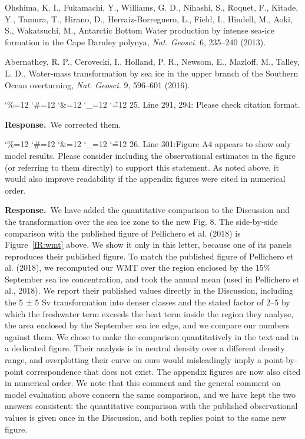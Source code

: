 \documentclass[11pt,a4paper]{article}
\newcommand{\comment}[1]{\par\medskip\noindent\color{black}\begingroup\catcode`\%=12 \catcode`\#=12 \catcode`\&=12 \catcode`\_=12 \catcode`\~=12 \commentbody}
\newcommand{\commentbody}[1]{#1\endgroup\par\smallskip}
\newcommand{\response}{\par\noindent\color{chgcol}\textbf{Response.}\ }
\begin{document}
Ohshima, K. I., Fukamachi, Y., Williams, G. D., Nihashi, S., Roquet, F., Kitade, Y., Tamura, T., Hirano, D., Herraiz-Borreguero, L., Field, I., Hindell, M., Aoki, S., Wakatsuchi, M., Antarctic Bottom Water production by intense sea-ice formation in the Cape Darnley polynya, \textit{Nat. Geosci.} 6, 235–240 (2013).

Abernathey, R. P., Cerovecki, I., Holland, P. R., Newsom, E., Mazloff, M., Talley, L. D., Water-mass transformation by sea ice in the upper branch of the Southern Ocean overturning, \textit{Nat. Geosci.} 9, 596–601 (2016).

\comment{R1}{25. Line 291, 294: Please check citation format.}

\response We corrected them.

\comment{R1}{26. Line 301:Figure A4 appears to show only model results. Please consider including the observational estimates in the figure (or referring to them directly) to support this statement. As noted above, it would also improve readability if the appendix figures were cited in numerical order.}

\response We have added the quantitative comparison to the Discussion and the transformation over the sea ice zone to the new Fig. 8. The side-by-side comparison with the published figure of Pellichero et al. (2018) is Figure~\ref{fR:wmt} above. We show it only in this letter, because one of its panels reproduces their published figure. To match the published figure of Pellichero et al. (2018), we recomputed our WMT over the region enclosed by the 15\% September sea ice concentration, and took the annual mean (used in Pellichero et al., 2018). We report their published values directly in the Discussion, including the 5 ± 5 Sv transformation into denser classes and the stated factor of 2–5 by which the freshwater term exceeds the heat term inside the region they analyse, the area enclosed by the September sea ice edge, and we compare our numbers against them. We chose to make the comparison quantitatively in the text and in a dedicated figure. Their analysis is in neutral density over a different density range, and overplotting their curve on ours would misleadingly imply a point-by-point correspondence that does not exist. The appendix figures are now also cited in numerical order. We note that this comment and the general comment on model evaluation above concern the same comparison, and we have kept the two answers consistent: the quantitative comparison with the published observational values is given once in the Discussion, and both replies point to the same new figure.
\end{document}
